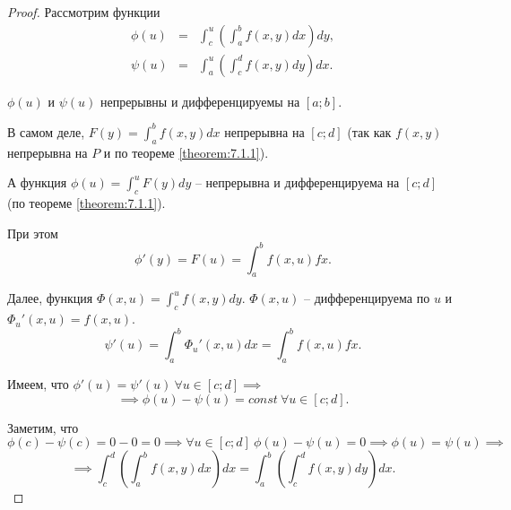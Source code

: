\begin{proof}
    Рассмотрим функции
    \begin{eqnarray*}
        \phi(u) &=& \int_{c}^{u}\left(\int_{a}^{b}f(x,y)dx\right)dy, \\
        \psi(u) &=& \int_{a}^{u}\left(\int_{c}^{d}f(x,y)dy\right)dx.
    \end{eqnarray*}

    $ \phi(u) $ и $ \psi(u) $ непрерывны и дифференцируемы на $ [a;b] $.

    В самом деле, $ F(y) = \int_{a}^{b}f(x,y)dx $ непрерывна на $ [c;d] $ (так как $ f(x,y) $ непрерывна на $ P $ и по теореме \ref{theorem:7.1.1}).

    А функция $ \phi(u) = \int_{c}^{u}F(y)dy $ -- непрерывна и дифференцируема на $ [c;d] $ (по теореме \ref{theorem:7.1.1}).

    При этом 
    \[
       \phi'(y) = F(u) = \int_{a}^{b}f(x,u)fx.
    \]

    Далее, функция $ \Phi(x,u) = \int_{c}^{u}f(x,y)dy $. $ \Phi(x,u) $ -- дифференцируема по $ u $ и $ \Phi_u'(x,u) = f(x,u) $.
    \[
       \psi'(u) = \int_{a}^{b}\Phi_u'(x,u)dx = \int_{a}^{b}f(x,u)fx.
    \]

    Имеем, что $ \phi'(u) = \psi'(u) \ \forall u \in [c;d] \implies $
    \[
       \implies \phi(u) - \psi(u) = const \ \forall u \in [c;d].
    \]

    Заметим, что $ \phi(c) - \psi(c) = 0 - 0 = 0 \implies \forall u \in [c;d] \ \phi(u) - \psi(u) = 0 \implies \phi(u) = \psi(u) \implies $
    \[
       \implies \int_{c}^{d}\left(\int_{a}^{b}f(x,y)dx\right)dx = \int_{a}^{b}\left(\int_{c}^{d}f(x,y)dy\right)dx.
    \]
\end{proof}

\newpage
